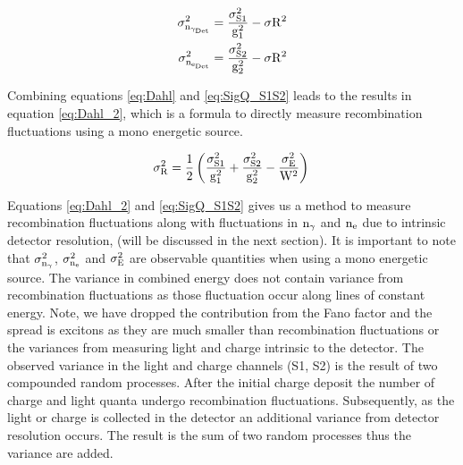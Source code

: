 \begin{equation}
\begin{split}
\rm  \sigma_{n_{\gamma_{Det}}}^2 = \frac{\sigma_{S1}^2}{g_1^2} - \sigma{R^2}\\
\rm \sigma_{n_{e_{Det}}}^2 = \frac{\sigma_{S2}^2}{g_2^2} - \sigma{R^2}
\label{eq:SigQ_S1S2}
\end{split}
\end{equation}

Combining equations \ref{eq:Dahl} and \ref{eq:SigQ_S1S2} leads to the results in equation \ref{eq:Dahl_2}, which is a formula to directly measure recombination fluctuations using a mono energetic source.

\begin{equation}
\rm \sigma_{R}^2  = \frac{1}{2}\left( \frac{\sigma_{S1}^2}{g_1^2} + \frac{\sigma_{S2}^2}{g_2^2} - \frac{\sigma_E^2}{W^2}\right)\\
\label{eq:Dahl_2}
\end{equation}

Equations \ref{eq:Dahl_2} and \ref{eq:SigQ_S1S2} gives us a method to measure recombination fluctuations along with fluctuations in $\rm n_\gamma$ and $\rm n_e$ due to intrinsic detector resolution, (will be discussed in the next section). It is important to note that $\rm \sigma_{n_\gamma}^2$, $\rm \sigma_{n_e}^2$ and $\rm \sigma_{E}^2 $ are observable quantities when using a mono energetic source. The variance in combined energy does not contain variance from recombination fluctuations as those fluctuation occur along lines of constant energy. Note, we have dropped the contribution from the Fano factor and the spread is excitons as they are much smaller than recombination fluctuations or the variances from measuring light and charge intrinsic to the detector. The observed variance in the light and charge channels (S1, S2) is the result of two compounded random processes. After the initial charge deposit the number of charge and light quanta undergo recombination fluctuations. Subsequently, as the light or charge is collected in the detector an additional variance from detector resolution occurs. The result is the sum of two random processes thus the variance are added.




